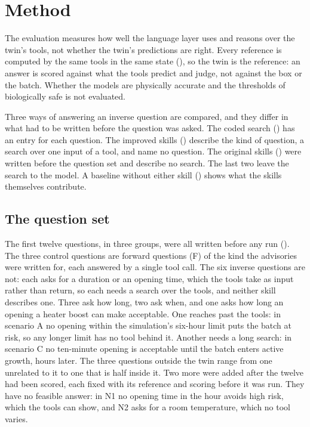   \section{Method}
  \label{sec:method}

  The evaluation measures how well the language layer uses and reasons over the twin's tools, not
  whether the twin's predictions are right. Every reference is computed by the same tools in the
  same state (), so the twin is the reference: an answer is scored against what
  the tools predict and judge, not against the box or the batch. Whether the models are physically
  accurate and the thresholds of  biologically safe is not evaluated.

  Three ways of answering an inverse question are compared, and they differ in what had to be
  written before the question was asked. The coded search () has an entry for each
  question. The improved skills () describe the kind of question, a search over
  one input of a tool, and name no question. The original skills () were
  written before the question set and describe no search. The last two leave the search to the
  model. A baseline without either skill () shows what the skills themselves
  contribute.

  \subsection{The question set}
  \label{sec:question-set}
  The first twelve questions, in three groups, were all written before any run
  (). The three control questions are forward questions (F) of the kind the advisories were written for,
  each answered by a single tool call. The six inverse questions are not: each asks for a
  duration or an opening time, which the tools take as input rather than return, so each needs a
  search over the tools, and neither skill describes one. Three ask how long, two ask when, and one asks how long an
  opening a heater boost can make acceptable. One reaches past the tools: in scenario A no opening within the simulation's
  six-hour limit puts the batch at risk, so any longer limit has no tool behind it. Another needs a
  long search: in scenario C no ten-minute opening is acceptable until the batch enters active growth, hours
  later. The three questions outside the twin range from one unrelated to it to one that is half
  inside it. Two more were added after the twelve had been scored, each fixed with its reference and
  scoring before it was run. They have no feasible answer: in N1 no opening time in the hour avoids
  high risk, which the tools can show, and N2 asks for a room temperature, which no tool varies.

